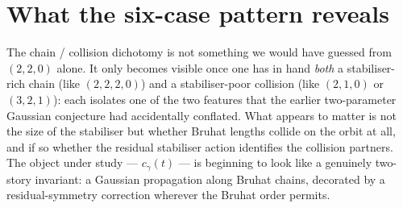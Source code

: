 \documentclass[11pt]{article}
\theoremstyle{definition}
\theoremstyle{remark}
\begin{document}
\section*{What the six-case pattern reveals}

The chain / collision dichotomy is not something we would have
guessed from $(2,2,0)$ alone. It only becomes visible once one has
in hand \emph{both} a stabiliser-rich chain (like $(2,2,2,0)$) and
a stabiliser-poor collision (like $(2,1,0)$ or $(3,2,1)$): each
isolates one of the two features that the earlier two-parameter
Gaussian conjecture had accidentally conflated. What appears to
matter is not the size of the stabiliser but whether Bruhat lengths
collide on the orbit at all, and if so whether the residual
stabiliser action identifies the collision partners. The object
under study --- $c_\gamma(t)$ --- is beginning to look like a
genuinely two-story invariant: a Gaussian propagation along Bruhat
chains, decorated by a residual-symmetry correction wherever the
Bruhat order permits.
\end{document}
